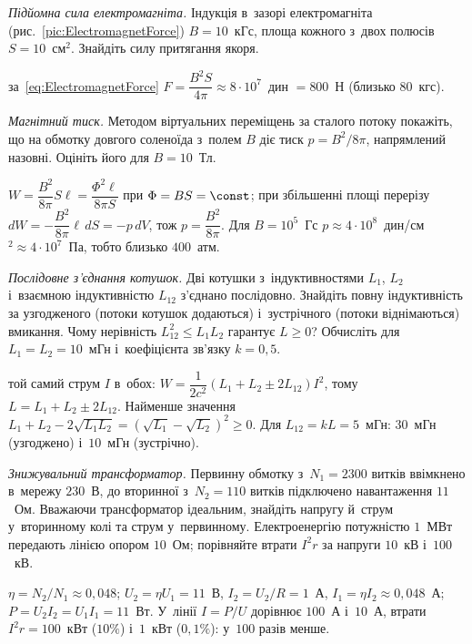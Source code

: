 \begin{problem}\label{prb:ElectromagnetNumbers}
	\emph{Підйомна сила електромагніта.} Індукція в~зазорі електромагніта (рис.~\ref{pic:ElectromagnetForce}) $B=10$~кГс, площа
	кожного з~двох полюсів $S=10$~см$^2$. Знайдіть силу притягання якоря.
	\begin{solution}
		за~\eqref{eq:ElectromagnetForce} $F=\dfrac{B^2S}{4\pi}\approx8\cdot10^{7}$~дин $=800$~Н (близько $80$~кгс).
	\end{solution}
\end{problem}

\begin{problem}\label{prb:MagneticPressure}
	\emph{Магнітний тиск.} Методом віртуальних переміщень за сталого потоку покажіть, що на обмотку довгого соленоїда з~полем $B$
	діє тиск $p=B^2/8\pi$, напрямлений назовні. Оцініть його для $B=10$~Тл.
	\begin{solution}
		$W=\dfrac{B^2}{8\pi}S\ell=\dfrac{\Phi^2\ell}{8\pi S}$ при $\Phi=BS=\const$; при збільшенні площі перерізу $dW=-\dfrac{B^2}{8\pi}\ell\,dS=-p\,dV$, тож $p=\dfrac{B^2}{8\pi}$. Для $B=10^5$~Гс $p\approx4\cdot10^{8}$~дин/см$^2\approx4\cdot10^{7}$~Па, тобто близько $400$~атм.
	\end{solution}
\end{problem}

\begin{problem}\label{prb:SeriesCoils}
	\emph{Послідовне з'єднання котушок.} Дві котушки з~індуктивностями $L_1$, $L_2$ і~взаємною індуктивністю $L_{12}$ з'єднано послідовно. Знайдіть повну індуктивність за узгодженого (потоки котушок додаються) і~зустрічного (потоки віднімаються) вмикання. Чому нерівність $L_{12}^2\le L_1L_2$ гарантує $L\ge0$? Обчисліть для $L_1=L_2=10$~мГн і~коефіцієнта зв'язку $k=0{,}5$.
	\begin{solution}
		той самий струм $I$ в~обох: $W=\dfrac{1}{2c^2}\left(L_1+L_2\pm2L_{12}\right)I^2$, тому $L=L_1+L_2\pm2L_{12}$. Найменше значення $L_1+L_2-2\sqrt{L_1L_2}=(\sqrt{L_1}-\sqrt{L_2})^2\ge0$. Для $L_{12}=kL=5$~мГн: $30$~мГн (узгоджено) і~$10$~мГн (зустрічно).
	\end{solution}
\end{problem}

\begin{problem}\label{prb:TransformerNumbers}
	\emph{Знижувальний трансформатор.} Первинну обмотку з~$N_1=2300$ витків ввімкнено в~мережу $230$~В, до вторинної з~$N_2=110$ витків підключено навантаження $11$~Ом. Вважаючи трансформатор ідеальним, знайдіть напругу й~струм у~вторинному колі та струм у~первинному. Електроенергію потужністю $1$~МВт передають лінією опором $10$~Ом; порівняйте втрати $I^2r$ за напруги $10$~кВ і~$100$~кВ.
	\begin{solution}
		$\eta=N_2/N_1\approx0{,}048$; $U_2=\eta U_1=11$~В, $I_2=U_2/R=1$~А, $I_1=\eta I_2\approx0{,}048$~А; $P=U_2I_2=U_1I_1=11$~Вт. У~лінії $I=P/U$ дорівнює $100$~А і~$10$~А, втрати $I^2r=100$~кВт ($10\%$) і~$1$~кВт ($0{,}1\%$): у~$100$ разів менше.
	\end{solution}
\end{problem}

